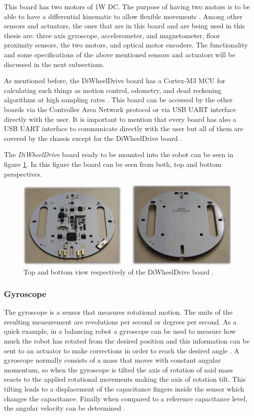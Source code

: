 \documentclass[12pt]{report}%
\begin{document}
This board has two motors of 1W DC. The purpose of having two motors is to be able to have a differential kinematic to allow flexible movements \cite{AMiRo_paper_modular}. Among other sensors and actuators, the ones that are in this board and are being used in this thesis are: three axis gyroscope, accelerometer, and magnetometer, floor proximity sensors, the two motors, and optical motor encoders. The functionality and some specifications of the above mentioned sensors and actuators will be discussed in the next subsections.

As mentioned before, the DiWheelDrive board has a Cortex-M3 MCU for calculating such things as motion control, odometry, and dead reckoning algorithms at high sampling rates \cite{AMiRo_paper_modular}. This board can be accessed by the other boards via the Controller Area Network protocol or via USB UART interface directly with the user. It is important to mention that every board has also a USB UART interface to communicate directly with the user but all of them are covered by the chassis except for the DiWheelDrive board \cite{AMiRo_paper_modular}.

The \textit{DiWheelDrive} board ready to be mounted into the robot can be seen in figure \ref{fig:diwheel}. In this figure the board can be seen from both, top and bottom perspectives.

\begin{figure}[ht]
	\centering
	\includegraphics[width=\textwidth]{DiWheel_real}
    \caption{Top and bottom view respectively of the DiWheelDrive board \cite{AMiRo_ppt_v1}.}
    \label{fig:diwheel}
\end{figure}
\clearpage

\subsubsection{Gyroscope}
The gyroscope is a sensor that measures rotational motion. The units of the resulting measurement are revolutions per second or degrees per second. As a quick example, in a balancing robot a gyroscope can be used to measure how much the robot has rotated from the desired position and this information can be sent to an actuator to make corrections in order to reach the desired angle \cite{gyrostheory}. A gyroscope normally consists of a mass that moves with constant angular momentum, so when the gyroscope is tilted the axis of rotation of said mass reacts to the applied rotational movements making the axis of rotation tilt. This tilting leads to a displacement of the capacitance fingers inside the sensor which changes the capacitance. Finally when compared to a reference capacitance level, the angular velocity can be determined \cite{AMiRo_ppt_v1}.
\end{document}
